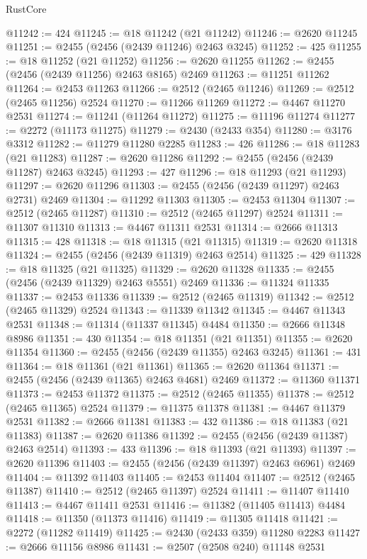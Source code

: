 \begin{lexlean}{RustCore}
\begin{coremodule}
@11242 := 424
@11245 := @18 @11242 (@21 @11242)
@11246 := @2620 @11245
@11251 := @2455 (@2456 (@2439 @11246) @2463 @3245)
@11252 := 425
@11255 := @18 @11252 (@21 @11252)
@11256 := @2620 @11255
@11262 := @2455 (@2456 (@2439 @11256) @2463 @8165) @2469
@11263 := @11251 @11262
@11264 := @2453 @11263
@11266 := @2512 (@2465 @11246)
@11269 := @2512 (@2465 @11256) @2524
@11270 := @11266 @11269
@11272 := @4467 @11270 @2531
@11274 := @11241 (@11264 @11272)
@11275 := @11196 @11274
@11277 := @2272 (@11173 @11275)
@11279 := @2430 (@2433 @354)
@11280 := @3176 @3312
@11282 := @11279 @11280 @2285
@11283 := 426
@11286 := @18 @11283 (@21 @11283)
@11287 := @2620 @11286
@11292 := @2455 (@2456 (@2439 @11287) @2463 @3245)
@11293 := 427
@11296 := @18 @11293 (@21 @11293)
@11297 := @2620 @11296
@11303 := @2455 (@2456 (@2439 @11297) @2463 @2731) @2469
@11304 := @11292 @11303
@11305 := @2453 @11304
@11307 := @2512 (@2465 @11287)
@11310 := @2512 (@2465 @11297) @2524
@11311 := @11307 @11310
@11313 := @4467 @11311 @2531
@11314 := @2666 @11313
@11315 := 428
@11318 := @18 @11315 (@21 @11315)
@11319 := @2620 @11318
@11324 := @2455 (@2456 (@2439 @11319) @2463 @2514)
@11325 := 429
@11328 := @18 @11325 (@21 @11325)
@11329 := @2620 @11328
@11335 := @2455 (@2456 (@2439 @11329) @2463 @5551) @2469
@11336 := @11324 @11335
@11337 := @2453 @11336
@11339 := @2512 (@2465 @11319)
@11342 := @2512 (@2465 @11329) @2524
@11343 := @11339 @11342
@11345 := @4467 @11343 @2531
@11348 := @11314 (@11337 @11345) @4484
@11350 := @2666 @11348 @8986
@11351 := 430
@11354 := @18 @11351 (@21 @11351)
@11355 := @2620 @11354
@11360 := @2455 (@2456 (@2439 @11355) @2463 @3245)
@11361 := 431
@11364 := @18 @11361 (@21 @11361)
@11365 := @2620 @11364
@11371 := @2455 (@2456 (@2439 @11365) @2463 @4681) @2469
@11372 := @11360 @11371
@11373 := @2453 @11372
@11375 := @2512 (@2465 @11355)
@11378 := @2512 (@2465 @11365) @2524
@11379 := @11375 @11378
@11381 := @4467 @11379 @2531
@11382 := @2666 @11381
@11383 := 432
@11386 := @18 @11383 (@21 @11383)
@11387 := @2620 @11386
@11392 := @2455 (@2456 (@2439 @11387) @2463 @2514)
@11393 := 433
@11396 := @18 @11393 (@21 @11393)
@11397 := @2620 @11396
@11403 := @2455 (@2456 (@2439 @11397) @2463 @6961) @2469
@11404 := @11392 @11403
@11405 := @2453 @11404
@11407 := @2512 (@2465 @11387)
@11410 := @2512 (@2465 @11397) @2524
@11411 := @11407 @11410
@11413 := @4467 @11411 @2531
@11416 := @11382 (@11405 @11413) @4484
@11418 := @11350 (@11373 @11416)
@11419 := @11305 @11418
@11421 := @2272 (@11282 @11419)
@11425 := @2430 (@2433 @359) @11280 @2283
@11427 := @2666 @11156 @8986
@11431 := @2507 (@2508 @240) @11148 @2531

\end{coremodule}
\end{lexlean}
